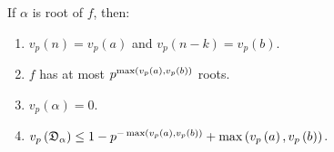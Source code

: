 \documentclass[../main.tex]{subfiles}
\begin{document}
\begin{lemma}
  If $\alpha$ is \anex root of $f$, then:
  \begin{enumerate}
    \item $v_p\left( n \right) = v_p\left( a \right)$ and $v_p\left( n - k \right) = v_p\left( b \right)$.
    \label{item:coefficient_valuation}
    \item 
    $f$ has at most $p^{\max\left( v_p\left( a \right), v_p\left( b \right) \right)}$ \ex roots.
    \label{item:maxppart}
    \item 
    $v_p\left( \alpha \right) = 0$.
    \label{item:root_valuation}
    \item $v_p\left( \mathfrak{D}_\alpha \right) \leq 1 - p^{-\max\left( v_p\left( a \right), v_p\left( b \right) \right)} + \max\left( v_p\left( a \right), v_p\left( b \right) \right)$.
    \label{item:ramification_degree}
  \end{enumerate}
\end{lemma}
\end{document}
